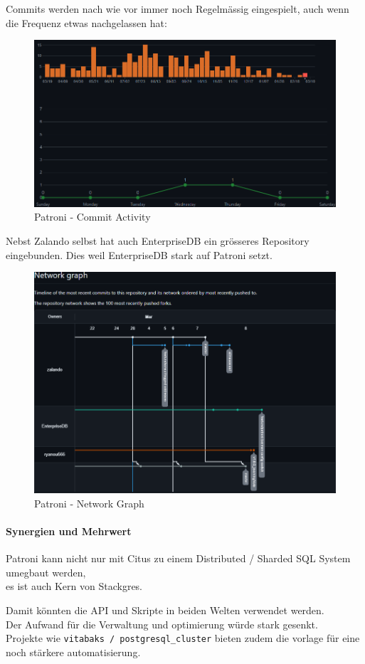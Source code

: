 \begin{flushleft}
    Commits werden nach wie vor immer noch Regelmässig eingespielt, auch wenn die Frequenz etwas nachgelassen hat:
    \begin{figure}[H]
        \centering
        \includegraphics[width=0.75\linewidth]{source/implementation/evaluation/postgresql_ha_solutions/insights/patroni/commit_activity_zalando_patroni}
        \caption{Patroni - Commit Activity}
        \label{fig:commit_activity_zalando_patroni}
    \end{figure}

    Nebst Zalando selbst hat auch EnterpriseDB\cite{LNF967SI} ein grösseres Repository eingebunden.
    Dies weil EnterpriseDB stark auf Patroni setzt.
     \begin{figure}[H]
        \centering
        \includegraphics[width=0.75\linewidth]{source/implementation/evaluation/postgresql_ha_solutions/insights/patroni/networkgraph_zalando_patroni}
        \caption{Patroni - Network Graph}
        \label{fig:networkgraph_zalando_patroni}
    \end{figure}
\end{flushleft}
\begin{flushleft}
    \paragraph{Synergien und Mehrwert}
    Patroni kann nicht nur mit Citus zu einem Distributed / Sharded SQL System umegbaut werden,\\
    es ist auch Kern von Stackgres.
\end{flushleft}
\begin{flushleft}
    Damit könnten die API und Skripte in beiden Welten verwendet werden.\\
    Der Aufwand für die Verwaltung und optimierung würde stark gesenkt.\\
    Projekte wie \texttt{vitabaks / postgresql\_cluster}\cite{HIQVBEPF} bieten zudem die vorlage für eine noch stärkere automatisierung.
\end{flushleft}